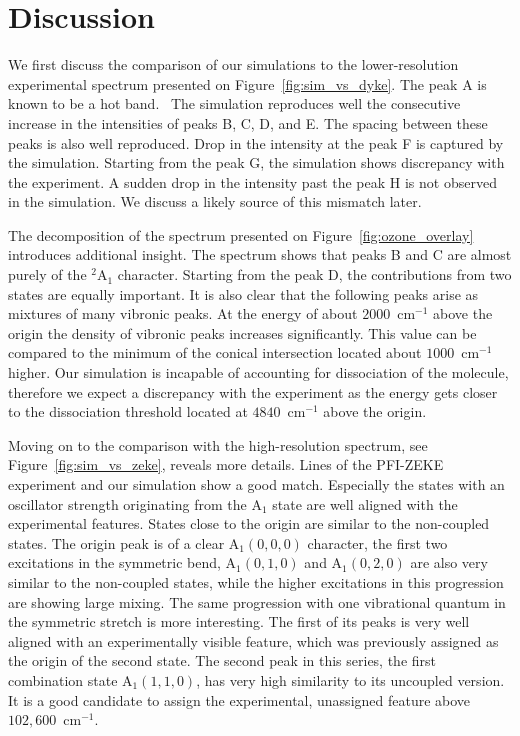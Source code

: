 \documentclass[
12pt,
a4paper,
prb,
superscriptaddress,
tightenlines,  %
]{revtex4}
\begin{document}
\section{Discussion} 

We first discuss the comparison of our simulations to the lower-resolution
experimental spectrum presented on Figure~\ref{fig:sim_vs_dyke}. The peak A is
known to be a hot band.~\cite{KDC:O3:92} The simulation reproduces well the
consecutive increase in the intensities of peaks B, C, D, and E. The spacing
between these peaks is also well reproduced. Drop in the intensity at the peak
F is captured by the simulation. Starting from the peak G, the simulation
shows discrepancy with the experiment. A sudden drop in the intensity past the
peak H is not observed in the simulation. We discuss a likely source of this
mismatch later.

The decomposition of the spectrum presented on Figure~\ref{fig:ozone_overlay}
introduces additional insight. The spectrum shows that peaks B and C are
almost purely of the $^2$A$_1$ character. Starting from the peak D, the
contributions from two states are equally important. It is also clear that the
following peaks arise as mixtures of many vibronic peaks. At the energy of
about $2000$~cm$^{-1}$ above the origin the density of vibronic peaks
increases significantly. This value can be compared to the minimum of the
conical intersection located about $1000$~cm$^{-1}$ higher. Our
simulation is incapable of accounting for dissociation of the molecule,
therefore we expect a discrepancy with the experiment as the energy gets
closer to the dissociation threshold located at $4840$~cm$^{-1}$ above the
origin.~\cite{Willitsch:O3ZEKE:2005}

Moving on to the comparison with the high-resolution spectrum, see
Figure~\ref{fig:sim_vs_zeke}, reveals more details. Lines of the PFI-ZEKE
experiment and our simulation show a good match. Especially the states with
an oscillator strength originating from the A$_1$ state are well aligned with
the experimental features. States close to the origin are similar to the
non-coupled states. The origin peak is of a clear A$_1(0,0,0)$ character, the
first two excitations in the symmetric bend, A$_1(0,1,0)$ and A$_1(0,2,0)$ are
also very similar to the non-coupled states, while the higher excitations in
this progression are showing large mixing. The same progression with one
vibrational quantum in the symmetric stretch is more interesting. The first of
its peaks is very well aligned with an experimentally visible feature, which
was previously assigned as the origin of the second state. The second peak in
this series, the first combination state A$_1(1,1,0)$, has very high
similarity to its uncoupled version. It is a good candidate to assign the
experimental, unassigned feature above $102,600$~cm$^{-1}$.
\end{document}
